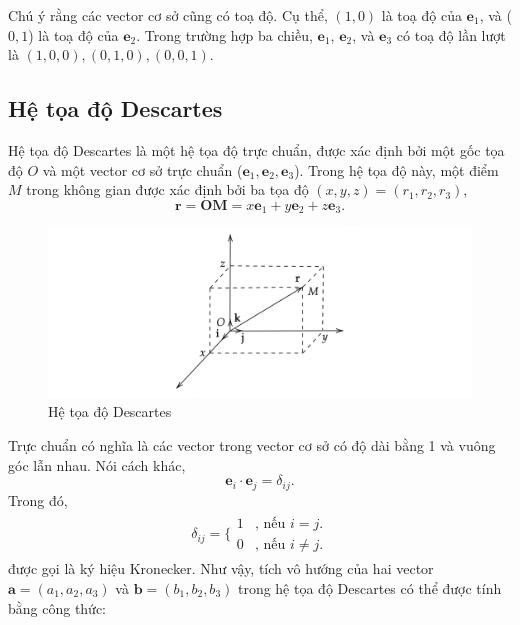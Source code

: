 Chú ý rằng các vector cơ sở cũng có toạ độ. Cụ thể, \((1,0)\) là toạ độ của \(\mathbf{e}_1\), và (\(0,1\)) là toạ độ của \(\mathbf{e}_2\). Trong trường hợp ba chiều, \(\mathbf{e}_1\), \(\mathbf{e}_2\), và \(\mathbf{e}_3\) có toạ độ lần lượt là \((1,0,0), (0,1,0), (0,0,1)\).

\subsection{Hệ tọa độ Descartes}
\begin{definition}
    Hệ tọa độ Descartes là một hệ tọa độ trực chuẩn, được xác định bởi một gốc tọa độ \(O\) và một vector cơ sở trực chuẩn (\(\mathbf{e}_1, \mathbf{e}_2, \mathbf{e}_3\)). Trong hệ tọa độ này, một điểm \(M\) trong không gian được xác định bởi ba tọa độ \((x, y, z)=(r_1, r_2, r_3)\),
    \begin{equation}
        \mathbf{r}=\mathbf{OM} = x\mathbf{e}_1 + y\mathbf{e}_2 + z\mathbf{e}_3.
    \end{equation}
\end{definition}
\begin{figure}[H]
    \centering
    \includegraphics[width=1\textwidth]{Tuan2/Figures/toadodescartes.png}
    \caption{Hệ tọa độ Descartes}
\end{figure}
Trực chuẩn có nghĩa là các vector trong vector cơ sở có độ dài bằng 1 và vuông góc lẫn nhau. Nói cách khác, 
\begin{equation}
    \mathbf{e}_i \cdot \mathbf{e}_j =\delta_{ij}.
\end{equation}
Trong đó, \begin{equation*}
\begin{array}{l}
     \delta_{ij}=\Bigg\{
    \begin{array}{ll}
      1  & \text{, nếu } i=j. \\
      0  & \text{, nếu } i\neq j.
    \end{array}
\end{array}
\end{equation*} được gọi là ký hiệu Kronecker. Như vậy, tích vô hướng của hai vector \(\mathbf{a}=(a_1, a_2, a_3)\) và \(\mathbf{b}=(b_1,b_2,b_3)\) trong hệ tọa độ Descartes có thể được tính bằng công thức:
